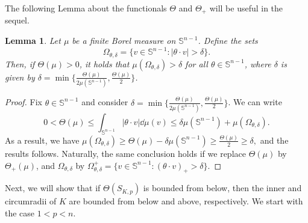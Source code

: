 \documentclass[a4paper, 10pt, twoside]{amsart}
\numberwithin{equation}{section}
\newcommand{\lemmname}{Lemma}
\theoremstyle{plain}
\newtheorem{lemma}[theorem]{\lemmname}
\theoremstyle{definition}
\begin{document}
The following Lemma about the functionals $\Theta$ and $\Theta_+$ will be useful in the sequel.
\begin{lemma}\label{lemma.Theta_plus_Theta}
    Let $\mu$ be a finite Borel measure on $\mathbb{S}^{n-1}$. Define the sets 
    \[
        \Omega_{\theta,\delta}=\{v\in \mathbb{S}^{n-1}: |\theta\cdot v| > \delta\}.
    \] 
    Then, if $\Theta(\mu) > 0$, it holds that $\mu(\Omega_{\theta,\delta}) > \delta$ for all $\theta \in \mathbb{S}^{n-1}$, where $\delta$ is given by $\delta = \min\{\frac{\Theta(\mu)}{2\mu(\mathbb{S}^{n-1})},\frac{\Theta(\mu)}{2}\}$.
\end{lemma}
\begin{proof}
    Fix $\theta \in \mathbb{S}^{n-1}$ and consider $\delta = \min\{\frac{\Theta(\mu)}{2\mu(\mathbb{S}^{n-1})},\frac{\Theta(\mu)}{2}\}$. We can write
    \[
        0 <\Theta(\mu) 
        \le 
        \int_{\mathbb{S}^{n-1}} |\theta\cdot v| \dd \mu(v)
        \le 
        \delta \mu(\mathbb{S}^{n-1}) + \mu(\Omega_{\theta,\delta}).
    \]
    As a result, we have 
    $
        \mu(\Omega_{\theta,\delta}) 
        \ge 
        \Theta(\mu) - \delta \mu(\mathbb{S}^{n-1}) 
        \ge 
        \frac{\Theta(\mu)}{2} \ge \delta,
    $ and the results follows. Naturally, the same conclusion holds if we replace $\Theta(\mu)$ by $\Theta_+(\mu)$, and $\Omega_{\theta,\delta}$ by $\Omega^+_{\theta,\delta} = \{v\in \mathbb{S}^{n-1}: (\theta\cdot v)_+ > \delta\}$.
\end{proof}

Next, we will show that if $\Theta(S_{K,p})$ is bounded from below, then the inner and circumradii of $K$ are bounded from below and above, respectively. We start with the case $1 < p < n$. 
\end{document}
